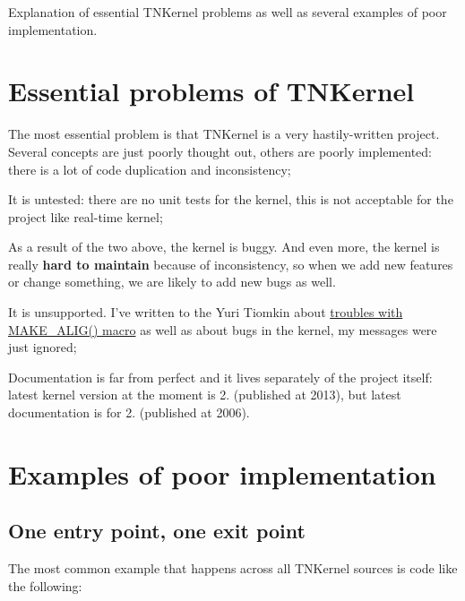 Explanation of essential T\+N\+Kernel problems as well as several examples of poor implementation.\hypertarget{why_reimplement_why_reimplement__problems_of_tnkernel}{}\section{Essential problems of T\+N\+Kernel}\label{why_reimplement_why_reimplement__problems_of_tnkernel}

\begin{DoxyItemize}
\item The most essential problem is that T\+N\+Kernel is a very hastily-\/written project. Several concepts are just poorly thought out, others are poorly implemented\+: there is a lot of code duplication and inconsistency;
\item It is untested\+: there are no unit tests for the kernel, this is not acceptable for the project like real-\/time kernel;
\end{DoxyItemize}

As a result of the two above, the kernel is buggy. And even more, the kernel is really {\bfseries hard to maintain} because of inconsistency, so when we add new features or change something, we are likely to add new bugs as well.


\begin{DoxyItemize}
\item It is unsupported. I've written to the Yuri Tiomkin about \hyperlink{tnkernel_diff_tnkernel_diff_make_alig}{troubles with M\+A\+K\+E\+\_\+\+A\+L\+I\+G() macro} as well as about bugs in the kernel, my messages were just ignored;
\item Documentation is far from perfect and it lives separately of the project itself\+: latest kernel version at the moment is 2. (published at 2013), but latest documentation is for 2. (published at 2006).
\end{DoxyItemize}\hypertarget{why_reimplement_why_reimplement__tnkernel_impl_details}{}\section{Examples of poor implementation}\label{why_reimplement_why_reimplement__tnkernel_impl_details}
\hypertarget{why_reimplement_why_reimplement__one_exit_point}{}\subsection{One entry point, one exit point}\label{why_reimplement_why_reimplement__one_exit_point}
The most common example that happens across all T\+N\+Kernel sources is code like the following\+:


